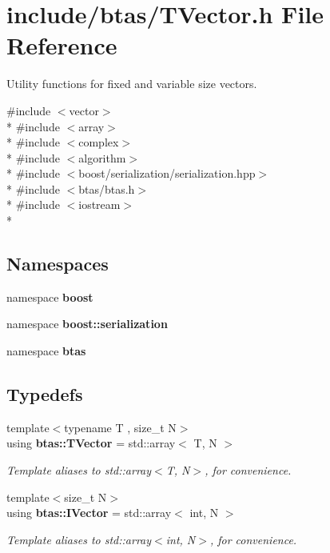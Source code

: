 \section{include/btas/\-T\-Vector.h File Reference}
\label{da/dd8/TVector_8h}


Utility functions for fixed and variable size vectors.  


{\ttfamily \#include $<$vector$>$}\\*
{\ttfamily \#include $<$array$>$}\\*
{\ttfamily \#include $<$complex$>$}\\*
{\ttfamily \#include $<$algorithm$>$}\\*
{\ttfamily \#include $<$boost/serialization/serialization.\-hpp$>$}\\*
{\ttfamily \#include $<$btas/btas.\-h$>$}\\*
{\ttfamily \#include $<$iostream$>$}\\*
\subsection*{Namespaces}
\begin{DoxyCompactItemize}
\item 
namespace {\bf boost}
\item 
namespace {\bf boost\-::serialization}
\item 
namespace {\bf btas}
\end{DoxyCompactItemize}
\subsection*{Typedefs}
\begin{DoxyCompactItemize}
\item 
{\footnotesize template$<$typename T , size\-\_\-t N$>$ }\\using {\bf btas\-::\-T\-Vector} = std\-::array$<$ T, N $>$
\begin{DoxyCompactList}\small\item\em Template aliases to std\-::array$<$\-T, N$>$, for convenience. \end{DoxyCompactList}\item 
{\footnotesize template$<$size\-\_\-t N$>$ }\\using {\bf btas\-::\-I\-Vector} = std\-::array$<$ int, N $>$
\begin{DoxyCompactList}\small\item\em Template aliases to std\-::array$<$int, N$>$, for convenience. \end{DoxyCompactList}\end{DoxyCompactItemize}
